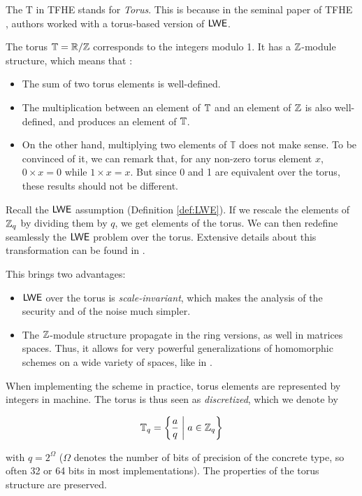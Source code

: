 The T in TFHE stands for \textit{Torus}. This is because in the seminal paper of TFHE \cite{JC:CGGI20}, authors worked with a torus-based version of $\textsf{LWE}$.


The torus $\mathbb{T} = \mathbb{R} / \mathbb{Z}$ corresponds to the integers modulo 1. It has a $\mathbb{Z}$-module structure, which means that :

\begin{itemize}
	\item The sum of two torus elements is well-defined.
	\item The multiplication between an element of $\mathbb{T}$ and an element of $\mathbb{Z}$ is also well-defined, and produces an element of $\mathbb{T}$.
	\item On the other hand, multiplying two elements of $\mathbb T$ does not make sense. To be convinced of it, we can remark that, for any non-zero torus element $x$, $0 \times x = 0$ while $1 \times x = x$. But since 0 and 1 are equivalent over the torus, these results should not be different. 
\end{itemize}



Recall the $\textsf{LWE}$ assumption (Definition \ref{def:LWE}). If we rescale the elements of $\mathbb{Z}_q$ by dividing them by $q$, we get elements of the torus. We can then redefine seamlessly the $\textsf{LWE}$ problem over the torus. Extensive details about this transformation can be found in \cite{these_chillotti}.


This brings two advantages:

\begin{itemize}
	\item $\textsf{LWE}$ over the torus is \textit{scale-invariant}, which makes the analysis of the security and of the noise much simpler.
	\item The $\mathbb{Z}$-module structure propagate in the ring versions, as well in matrices spaces. Thus, it allows for very powerful generalizations of homomorphic schemes on a wide variety of spaces, like in \cite{chimera, chimera2}.
\end{itemize} 


When implementing the scheme in practice, torus elements are represented by integers in machine. The torus is thus seen as \textit{discretized}, which we denote by 

\[ \mathbb{T}_q = \left \{   \frac a q \;\middle|\; a \in \mathbb{Z}_q  \right \} \] 

with $q = 2^\Omega$ ($\Omega$ denotes the number of bits of precision of the concrete type, so often 32 or 64 bits in most implementations). The properties of the torus structure are preserved.


